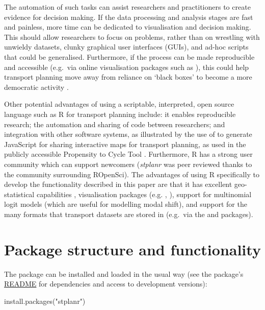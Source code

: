 The automation of such tasks can assist researchers and practitioners to
create evidence for decision making. If the data processing and analysis
stages are fast and painless, more time can be dedicated to
visualisation and decision making. This should allow researchers to
focus on problems, rather than on wrestling with unwieldy datasets,
clunky graphical user interfaces (GUIs), and ad-hoc scripts that could
be generalised. Furthermore, if the process can be made reproducible and
accessible (e.g.~via online visualisation packages such as
), this could help transport
planning move away from reliance on `black boxes' to become a more
democratic activity
\citep{waddell_urbansim:_2002,hollander_who_2015}.

Other potential advantages of using a scriptable, interpreted, open source
language such as R for transport planning include:
it enables reproducible research; the automation and sharing of
code between researchers; and integration with other
software systems, as illustrated by the use of 
to generate JavaScript for sharing interactive maps for transport planning,
as used in the publicly accessible Propensity to Cycle Tool \citep{lovelace_propensity_2017}.
Furthermore, R has a strong user community which can support newcomers
(\emph{stplanr} was peer reviewed thanks to the community surrounding ROpenSci).
The advantages of using R specifically to develop the
functionality described in this paper are that it has excellent
geo-statistical capabilities \citep{pebesma_software_2015},
visualisation packages (e.g. , ),
support for multinomial logit models (which are useful for modelling modal shift),
and support for the many formats that transport datasets are stored in (e.g.~via the
 and  packages).

\section{Package structure and
functionality}\label{package-structure-and-functionality}

The package can be installed and loaded in the usual way (see the
package's \href{https://github.com/ropensci/stplanr}{README} for
dependencies and access to development versions):

\begin{Schunk}
\begin{Sinput}
install.packages("stplanr")
\end{Sinput}
\end{Schunk}

